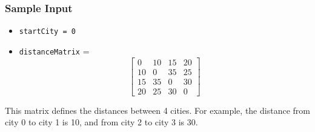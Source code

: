 \documentclass{article}
\begin{document}
\subsubsection*{Sample Input}
\begin{itemize}
    \item \texttt{startCity = 0}
    \item \texttt{distanceMatrix} =
    \[
    \begin{bmatrix}
    0 & 10 & 15 & 20 \\
    10 & 0 & 35 & 25 \\
    15 & 35 & 0 & 30 \\
    20 & 25 & 30 & 0
    \end{bmatrix}
    \]
\end{itemize}

This matrix defines the distances between 4 cities. For example, the distance from city 0 to city 1 is 10, and from city 2 to city 3 is 30.
\end{document}
